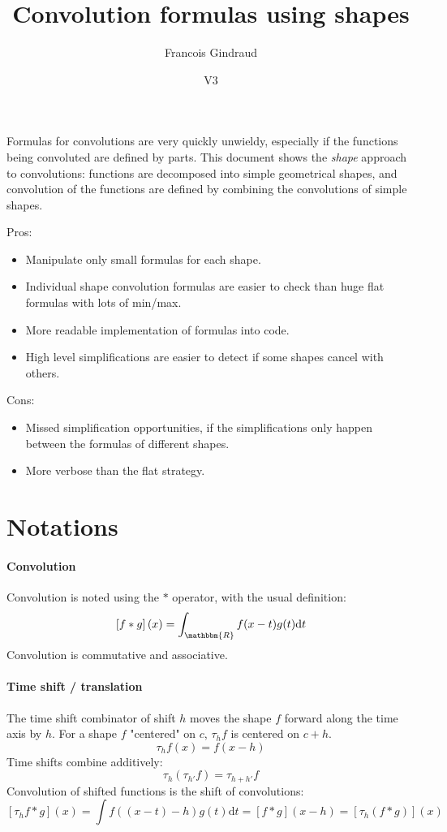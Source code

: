 \documentclass[a4paper,10pt]{article}
\title{Convolution formulas using shapes}
\author{Francois Gindraud}
\date{V3}
\newcommand\D{\mathrm{d}}
\newcommand\R{\mathbbm{R}}
\newcommand\Convolution{\ast}
\begin{document}
\maketitle

Formulas for convolutions are very quickly unwieldy, especially if the functions being convoluted are defined by parts.
This document shows the \emph{shape} approach to convolutions: functions are decomposed into simple geometrical shapes, and convolution of the functions are defined by combining the convolutions of simple shapes.

Pros:
\begin{itemize}
    \item Manipulate only small formulas for each shape.
    \item Individual shape convolution formulas are easier to check than huge flat formulas with lots of min/max.
    \item More readable implementation of formulas into code.
    \item High level simplifications are easier to detect if some shapes cancel with others.
\end{itemize}
Cons:
\begin{itemize}
    \item Missed simplification opportunities, if the simplifications only happen between the formulas of different shapes.
    \item More verbose than the flat strategy.
\end{itemize}

\section{Notations}

\paragraph{Convolution}
Convolution is noted using the $\Convolution$ operator, with the usual definition:
\[ \left[ f \Convolution g \right](x) = \int_\R f(x - t) g(t) \D t \]
Convolution is commutative and associative.

\paragraph{Time shift / translation}
The time shift combinator of shift $h$ moves the shape $f$ forward along the time axis by $h$.
For a shape $f$ "centered" on $c$, $\tau_h f$ is centered on $c+h$.
\[ \tau_h f(x) = f(x - h) \]
Time shifts combine additively:
\[ \tau_h (\tau_{h'} f) = \tau_{h+h'} f \]
Convolution of shifted functions is the shift of convolutions:
\[
    \left[ \tau_h f \Convolution g \right](x) =
    \int f((x - t) - h) g(t) \D t =
    \left[ f \Convolution g \right](x-h) =
    [\tau_h (f \Convolution g)](x)
\]
\end{document}
